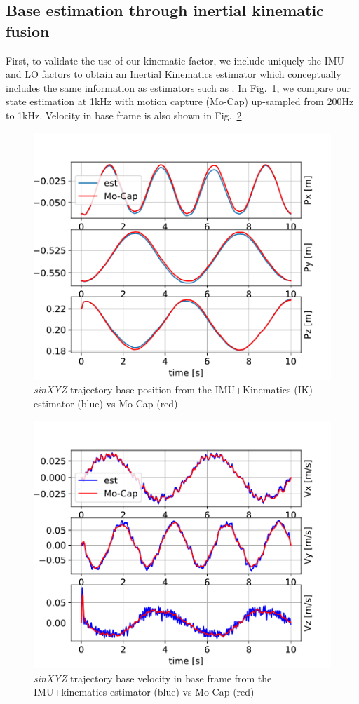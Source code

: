 \subsection{Base estimation through inertial kinematic fusion}
First, to validate the use of our kinematic factor, we include uniquely the IMU and LO factors to obtain an Inertial Kinematics  estimator which conceptually includes the same information as estimators such as \cite{bloesch2013state}. In Fig.~\ref{fig:PosiIK4}, we compare our state estimation at 1kHz with motion capture (Mo-Cap) up-sampled from 200Hz to 1kHz.
Velocity in base frame is also shown in Fig.~\ref{fig:VelIK4}.
%
\begin{figure}[t]
    \centering
    \includegraphics[height=0.6\columnwidth]{figures/centroidal/base_position_IK4.pdf}
    \caption{\textit{sinXYZ} trajectory base position from the IMU+Kinematics (IK) estimator (blue) vs Mo-Cap (red)}
    \label{fig:PosiIK4}
\end{figure}
%
\begin{figure}[t]
    \centering
    \includegraphics[height=0.6\columnwidth]{figures/centroidal/base_velocity_base_frame_IK4.pdf}
    \caption{\textit{sinXYZ} trajectory base velocity in base frame from the IMU+kinematics estimator (blue) vs Mo-Cap (red)}
    \label{fig:VelIK4}
\end{figure}

